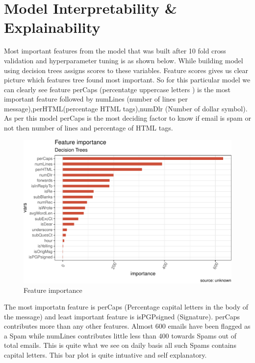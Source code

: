 \documentclass[
]{article}
\begin{document}
\newpage

\hypertarget{model-interpretability-explainability}{%
\section{Model Interpretability \&
Explainability}\label{model-interpretability-explainability}}

Most important features from the model that was built after 10 fold
cross validation and hyperparameter tuning is as shown below. While
building model using decision trees assigns scores to these variables.
Feature scores gives us clear picture which features tree found most
important. So for this particular model we can clearly see feature
perCaps (percentatge uppercase letters ) is the most important feature
followed by numLines (number of lines per message),perHTML(percentage
HTML tags),numDlr (Number of dollar symbol). As per this model perCaps
is the most deciding factor to know if email is spam or not then number
of lines and percentage of HTML tags.

\begin{figure}[H]
\includegraphics{case_study03_files/figure-latex/unnamed-chunk-28-1} \caption{Feature importance}\label{fig:unnamed-chunk-28}
\end{figure}

The most importatn feature is perCaps (Percentage capital letters in the
body of the message) and least important feature is isPGPsigned
(Signature). perCaps contributes more than any other features. Almost
600 emails have been flagged as a Spam while numLines contributes little
less than 400 towards Spams out of total emails. This is quite what we
see on daily basis all such Spams contains capital letters. This bar
plot is quite intuative and self explanatory.
\end{document}
